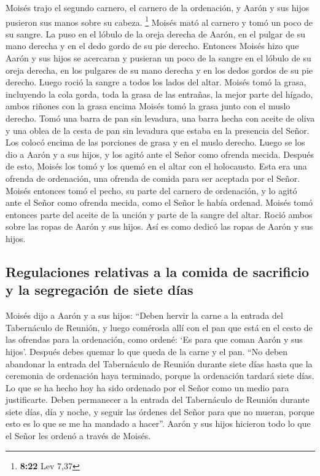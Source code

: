  Moisés trajo el segundo carnero, el carnero de la
ordenación, y Aarón y sus hijos pusieron sus manos sobre su cabeza.
\footnote{\textbf{8:22} Lev 7,37}  Moisés mató al carnero
y tomó un poco de su sangre. La puso en el lóbulo de la oreja derecha de
Aarón, en el pulgar de su mano derecha y en el dedo gordo de su pie
derecho.  Entonces Moisés hizo que Aarón y sus hijos se
acercaran y pusieran un poco de la sangre en el lóbulo de su oreja
derecha, en los pulgares de su mano derecha y en los dedos gordos de su
pie derecho. Luego roció la sangre a todos los lados del altar.
 Moisés tomó la grasa, incluyendo la cola gorda, toda la
grasa de las entrañas, la mejor parte del hígado, ambos riñones con la
grasa encima Moisés tomó la grasa junto con el muslo derecho.
 Tomó una barra de pan sin levadura, una barra hecha con
aceite de oliva y una oblea de la cesta de pan sin levadura que estaba
en la presencia del Señor. Los colocó encima de las porciones de grasa y
en el muslo derecho.  Luego se los dio a Aarón y a sus
hijos, y los agitó ante el Señor como ofrenda mecida. 
Después de esto, Moisés los tomó y los quemó en el altar con el
holocausto. Esta era una ofrenda de ordenación, una ofrenda de comida
para ser aceptada por el Señor.  Moisés entonces tomó el
pecho, su parte del carnero de ordenación, y lo agitó ante el Señor como
ofrenda mecida, como el Señor le había ordenad.  Moisés
tomó entonces parte del aceite de la unción y parte de la sangre del
altar. Roció ambos sobre las ropas de Aarón y sus hijos. Así es como
dedicó las ropas de Aarón y sus hijos.

\hypertarget{regulaciones-relativas-a-la-comida-de-sacrificio-y-la-segregaciuxf3n-de-siete-duxedas}{%
\subsection{Regulaciones relativas a la comida de sacrificio y la
segregación de siete
días}\label{regulaciones-relativas-a-la-comida-de-sacrificio-y-la-segregaciuxf3n-de-siete-duxedas}}

 Moisés dijo a Aarón y a sus hijos: ``Deben hervir la
carne a la entrada del Tabernáculo de Reunión, y luego comérosla allí
con el pan que está en el cesto de las ofrendas para la ordenación, como
ordené: `Es para que coman Aarón y sus hijos'.  Después
debes quemar lo que queda de la carne y el pan.  ``No
deben abandonar la entrada del Tabernáculo de Reunión durante siete días
hasta que la ceremonia de ordenación haya terminado, porque la
ordenación tardará siete días.  Lo que se ha hecho hoy ha
sido ordenado por el Señor como un medio para justificarte.
 Deben permanecer a la entrada del Tabernáculo de Reunión
durante siete días, día y noche, y seguir las órdenes del Señor para que
no mueran, porque esto es lo que se me ha mandado a hacer''.
 Aarón y sus hijos hicieron todo lo que el Señor les
ordenó a través de Moisés.

